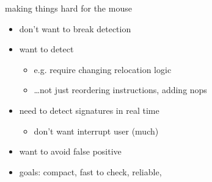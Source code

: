 
\begin{frame}{making things hard for the mouse}
    \begin{itemize}
    \item don't want  to break detection
    \item want to detect 
        \begin{itemize}
        \item e.g. require changing relocation logic
        \item \ldots not just reordering instructions, adding nops
        \end{itemize}
    \item need to detect signatures in real time
        \begin{itemize}
        \item don't want interrupt user (much)
        \end{itemize}
    \item want to avoid false positive
    \item goals: compact, fast to check, reliable, 
    \end{itemize}
\end{frame}

